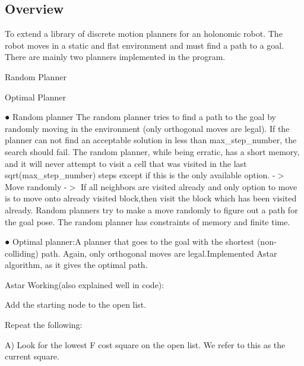 \href{https://travis-ci.org/dpiet/cpp-boilerplate}{\tt } \subsection*{\href{https://coveralls.io/github/dpiet/cpp-boilerplate?branch=master}{\tt } }

\subsection*{Overview}

To extend a library of discrete motion planners for an holonomic robot. The robot moves in a static and flat environment and must find a path to a goal. There are mainly two planners implemented in the program.
\begin{DoxyEnumerate}
\item Random Planner
\item Optimal Planner
\end{DoxyEnumerate}

● Random planner The random planner tries to find a path to the goal by randomly moving in the environment (only orthogonal moves are legal). If the planner can not find an acceptable solution in less than max\+\_\+step\+\_\+number, the search should fail. The random planner, while being erratic, has a short memory, and it will never attempt to visit a cell that was visited in the last sqrt(max\+\_\+step\+\_\+number)​ steps except if this is the only available option. -\/$>$ Move randomly -\/$>$ If all neighbors are visited already and only option to move is to move onto already visited block,then visit the block which has been visited already. Random planners try to make a move randomly to figure out a path for the goal pose. The random planner has constraints of memory and finite time.

● Optimal planner\+:A planner that goes to the goal with the shortest (non-\/colliding) path. Again, only orthogonal moves are legal.\+Implemented Astar algorithm, as it gives the optimal path.

Astar Working(also explained well in code)\+:


\begin{DoxyEnumerate}
\item Add the starting node to the open list.
\item Repeat the following\+:
\end{DoxyEnumerate}

A) Look for the lowest F cost square on the open list. We refer to this as the current square.

